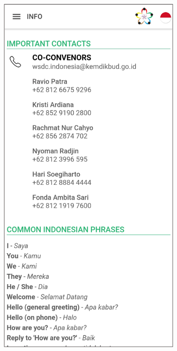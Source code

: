 \begin{figure}[H]
     \centering
     \begin{subfigure}[b]{0.3\textwidth}
         \centering
         \includegraphics[width=\textwidth]{Gambar/SSInfo.png}

\end{subfigure}
\end{figure}
